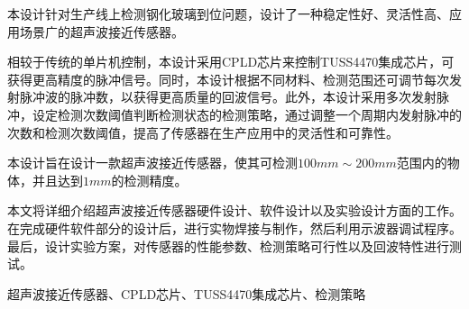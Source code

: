 \begin{ZhAbstract}
    本设计针对生产线上检测钢化玻璃到位问题，设计了一种稳定性好、灵活性高、应用场景广的超声波接近传感器。\par
    相较于传统的单片机控制，本设计采用CPLD芯片来控制TUSS4470集成芯片，可获得更高精度的脉冲信号。同时，本设计根据不同材料、检测范围还可调节每次发射脉冲波的脉冲数，以获得更高质量的回波信号。此外，本设计采用多次发射脉冲，设定检测次数阈值判断检测状态的检测策略，通过调整一个周期内发射脉冲的次数和检测次数阈值，提高了传感器在生产应用中的灵活性和可靠性。\par
    本设计旨在设计一款超声波接近传感器，使其可检测$100mm\sim200mm$范围内的物体，并且达到$1mm$的检测精度。
    
    本文将详细介绍超声波接近传感器硬件设计、软件设计以及实验设计方面的工作。在完成硬件软件部分的设计后，进行实物焊接与制作，然后利用示波器调试程序。最后，设计实验方案，对传感器的性能参数、检测策略可行性以及回波特性进行测试。    
    
    \ChineseKeyWord 超声波接近传感器、CPLD芯片、TUSS4470集成芯片、检测策略
    
\end{ZhAbstract}